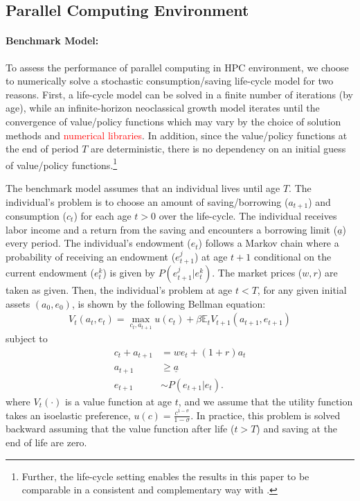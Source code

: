 \documentclass[12pt]{article}
\begin{document}
\subsection{Parallel Computing Environment}
\paragraph{Benchmark Model:}
To assess the performance of parallel computing in HPC environment, we choose to numerically solve a stochastic consumption/saving life-cycle model for two reasons. First, a life-cycle model can be solved in a finite number of iterations (by age), while an infinite-horizon neoclassical growth model iterates until the convergence of value/policy functions which may vary by the choice of solution methods and \textcolor{red}{numerical libraries}. In addition, since the value/policy functions at the end of period $T$ are deterministic, there is no dependency on an initial guess of value/policy functions.\footnote{\sf Further, the life-cycle setting enables the results in this paper to be comparable in a consistent and complementary way with \cite{Fernandez-Villaverde-Valencia-18}.}

The benchmark model assumes that an individual lives until age $T$. The individual's problem is to choose an amount of saving/borrowing ($a_{t+1}$) and consumption ($c_t$) for each age $t>0$ over the life-cycle. The individual receives labor income and a return from the saving and encounters a borrowing limit ($\underline{a}$) every period. The individual's endowment ($e_t$) follows a Markov chain where a probability of receiving an endowment ($e^j_{t+1}$) at age $t+1$ conditional on the current endowment ($e^k_t$) is given by $P(e^j_{t+1}|e^k_{t})$. The market prices ($w,r$) are taken as given. Then, the individual's problem at age $t<T$, for any given initial assets $(a_0,e_0)$, is shown by the following Bellman equation:
\begin{align*}
V_t(a_{t},e_t) = \max_{c_t,a_{t+1}} u(c_{t}) + \beta \mathbb{E}_t V_{t+1}(a_{t+1},e_{t+1})
\end{align*}
subject to
\begin{align*}
c_t + a_{t+1} 	&= w e_t + (1+r)a_t \\
a_{t+1} 		&\geq \underline{a}\\
e_{t+1} 		&\sim P(e_{t+1}|e_t).
\end{align*}
where $V_t(\cdot)$ is a value function at age $t$, and we assume that the utility function takes an isoelastic preference, $u(c) = \frac{c^{1-\sigma}}{1-\sigma}$. In practice, this problem is solved backward assuming that the value function after life ($t>T$) and saving at the end of life are zero.
\end{document}
